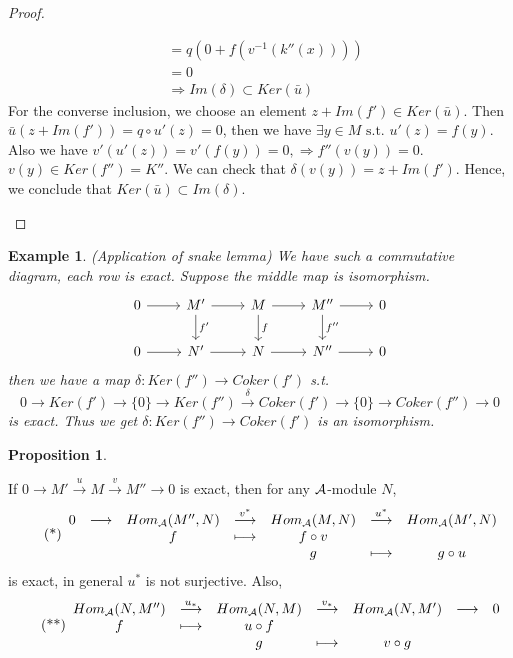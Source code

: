 \documentclass[11pt]{article}
\newtheorem{prop}[thm]{Proposition}
\newtheorem{ex}[thm]{Example}
\newcommand{\cala}{{\cal A}}
\newcommand{\rta}{\rightarrow}
\newcommand{\Lrta}{\Longrightarrow}
\newcommand{\lrta}{\longrightarrow}
\begin{document}
\begin{proof}
\begin{enumerate}
$$\begin{aligned}
&=q(0+f(v^{-1}(k''(x))))\\
&=0\\
&\Lrta Im(\delta)\subset Ker(\bar{u})
\end{aligned}
$$
For the converse inclusion, we choose an element $z+Im(f')\in Ker(\bar{u})$. Then $\bar{u}(z+Im(f'))=q\circ u'(z)=0$, then we have $\exists y\in M \text{ s.t. } u'(z)=f(y)$. Also we have $v'(u'(z))=v'(f(y))=0,\Lrta f''(v(y))=0$. $v(y)\in Ker(f'')=K''$. We can check that $\delta(v(y))=z+Im(f')$. Hence, we conclude that $Ker(\bar{u})\subset Im(\delta)$.
\end{enumerate}
\end{proof}

\begin{ex}
(Application of snake lemma) We have such a commutative diagram, each row is exact. Suppose the middle map is isomorphism. 
\[
\begin{tikzcd}
0\arrow[r]  & M'  \arrow[r]\arrow[d,"f'"] & M\arrow[r] \arrow[d,"f"] & M''\arrow[r] \arrow[d,"f''"] & 0 \\
0\arrow[r]  & N'  \arrow[r] & N\arrow[r] & N''\arrow[r]  & 0 
\end{tikzcd}
\]
then we have a map $\delta: Ker(f'')\lrta Coker(f')$ s.t.  
$$
0\lrta Ker(f')\lrta \{0\} \rta Ker(f'')\overset{\delta}{\lrta}Coker(f')\lrta \{0\}\lrta Coker(f'')\lrta 0 
$$
is exact. Thus we get $\delta:Ker(f'')\lrta Coker(f')$ is an isomorphism.
\end{ex}
\begin{prop}

\end{prop}
If $0\lrta M'\overset{u}{\lrta}M\overset{v}{\lrta}M'' \lrta0$  is exact, then for any $\cala$-module $N$,
\begin{equation}\label{eq:1}\tag{*}
\begin{array}{ c c c c c c c c c}
0 & \longrightarrow  & Hom_\cala(M'',N) & \overset{v^*}{\longrightarrow } & Hom_\cala(M,N) & \overset{u^*}{\longrightarrow } & Hom_\cala(M',N)  \\
 &  & f &\longmapsto  & f\circ v &  &   \\
 &  &  &  & g & \longmapsto & g\circ u 
\end{array}
\end{equation}
is exact, in general $u^*$ is not surjective. Also,
\begin{equation}\label{eq:2}\tag{**}
\begin{array}{ c c c c c c c c c}
  Hom_\cala(N,M'') & \overset{u_*}{\longrightarrow } & Hom_\cala(N,M) & \overset{v_*}{\longrightarrow } & Hom_\cala(N,M') & \longrightarrow  & 0\\
  f &\longmapsto  & u\circ f  &  &  &  & \\
   &  & g & \longmapsto & v\circ g &  &
\end{array}
\end{equation}
\end{document}
